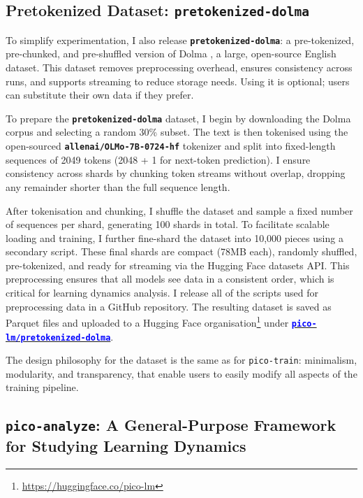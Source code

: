 \subsection{Pretokenized Dataset: \texttt{pretokenized-dolma}}

To simplify experimentation, I also release \textbf{\texttt{pretokenized-dolma}}: a pre-tokenized, pre-chunked, and pre-shuffled version of Dolma \citep{soldaini2024dolma}, a large, open-source English dataset. This dataset removes preprocessing overhead, ensures consistency across runs, and supports streaming to reduce storage needs. Using it is optional; users can substitute their own data if they prefer. 

To prepare the \textbf{\texttt{pretokenized-dolma}} dataset, I begin by downloading the Dolma corpus and selecting a random 30\% subset. The text is then tokenised using the open-sourced \textbf{\texttt{allenai/OLMo-7B-0724-hf}} tokenizer and split into fixed-length sequences of 2049 tokens (2048 + 1 for next-token prediction). I ensure consistency across shards by chunking token streams without overlap, dropping any remainder shorter than the full sequence length.

After tokenisation and chunking, I shuffle the dataset and sample a fixed number of sequences per shard, generating 100 shards in total. To facilitate scalable loading and training, I further fine-shard the dataset into 10,000 pieces using a secondary script. These final shards are compact (78MB each), randomly shuffled, pre-tokenized, and ready for streaming via the Hugging Face datasets API. This preprocessing ensures that all models see data in a consistent order, which is critical for learning dynamics analysis. I release all of the scripts used for preprocessing data in a GitHub repository. The resulting dataset is saved as Parquet files and uploaded to a Hugging Face organisation\footnote{\url{https://huggingface.co/pico-lm}} under \href{https://huggingface.co/datasets/pico-lm/pretokenized-dolma}{\textcolor{blue}{\textbf{\texttt{pico-lm/pretokenized-dolma}}}}.

The design philosophy for the dataset is the same as for \texttt{pico-train}: minimalism, modularity, and transparency, that enable users to easily modify all aspects of the training pipeline. 

\subsection{\texttt{pico-analyze}: A General-Purpose Framework for Studying Learning Dynamics}

